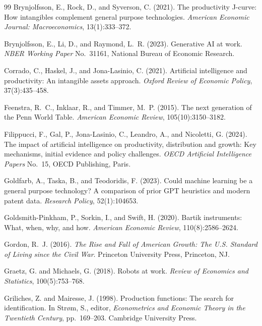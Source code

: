 \documentclass[11pt,a4paper]{article}
\begin{document}
\begin{thebibliography}{99}
Brynjolfsson, E., Rock, D., and Syverson, C. (2021).
\newblock The productivity J-curve: How intangibles complement general purpose technologies.
\newblock \emph{American Economic Journal: Macroeconomics}, 13(1):333--372.

Brynjolfsson, E., Li, D., and Raymond, L.~R. (2023).
\newblock Generative AI at work.
\newblock \emph{NBER Working Paper} No.~31161, National Bureau of Economic Research.

Corrado, C., Haskel, J., and Jona-Lasinio, C. (2021).
\newblock Artificial intelligence and productivity: An intangible assets approach.
\newblock \emph{Oxford Review of Economic Policy}, 37(3):435--458.

Feenstra, R.~C., Inklaar, R., and Timmer, M.~P. (2015).
\newblock The next generation of the Penn World Table.
\newblock \emph{American Economic Review}, 105(10):3150--3182.

Filippucci, F., Gal, P., Jona-Lasinio, C., Leandro, A., and Nicoletti, G. (2024).
\newblock The impact of artificial intelligence on productivity, distribution and growth: Key mechanisms, initial evidence and policy challenges.
\newblock \emph{OECD Artificial Intelligence Papers} No.~15, OECD Publishing, Paris.

Goldfarb, A., Taska, B., and Teodoridis, F. (2023).
\newblock Could machine learning be a general purpose technology? A comparison of prior GPT heuristics and modern patent data.
\newblock \emph{Research Policy}, 52(1):104653.

Goldsmith-Pinkham, P., Sorkin, I., and Swift, H. (2020).
\newblock Bartik instruments: What, when, why, and how.
\newblock \emph{American Economic Review}, 110(8):2586--2624.

Gordon, R.~J. (2016).
\newblock \emph{The Rise and Fall of American Growth: The U.S. Standard of Living since the Civil War}.
\newblock Princeton University Press, Princeton, NJ.

Graetz, G. and Michaels, G. (2018).
\newblock Robots at work.
\newblock \emph{Review of Economics and Statistics}, 100(5):753--768.

Griliches, Z. and Mairesse, J. (1998).
\newblock Production functions: The search for identification.
\newblock In Str{\o}m, S., editor, \emph{Econometrics and Economic Theory in the Twentieth Century}, pp.~169--203. Cambridge University Press.


\end{thebibliography}
\end{document}
